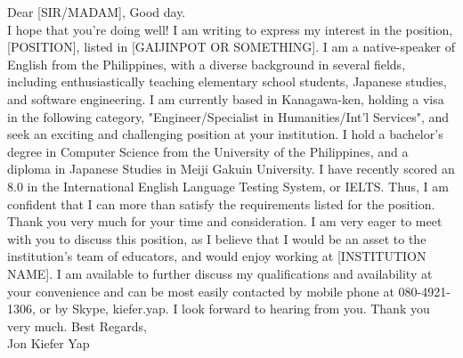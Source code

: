 
Dear [SIR/MADAM],
\doublenewline
Good day. \\
I hope that you're doing well!
\doublenewline
I am writing to express my interest in the position, [POSITION], listed in [GAIJINPOT OR SOMETHING]. 
I am a native-speaker of English from the Philippines, with a diverse background in several fields, including enthusiastically teaching elementary school students, Japanese studies, and software engineering. 
\doublenewline
I am currently based in Kanagawa-ken, holding a visa in the following category, "Engineer/Specialist in Humanities/Int'l Services", and seek an exciting and challenging position at your institution. I hold a bachelor's degree in Computer Science from the University of the Philippines, and a diploma in Japanese Studies in Meiji Gakuin University. I have recently scored an 8.0 in the International English Language Testing System, or IELTS. Thus, I am confident that I can more than satisfy the requirements listed for the position.
\doublenewline
Thank you very much for your time and consideration. I am very eager to meet with you to discuss this position, as I believe that I would be an asset to the institution's team of educators, and would enjoy working at [INSTITUTION NAME]. I am available to further discuss my qualifications and availability at your convenience and can be most easily contacted by mobile phone at 080-4921-1306, or by Skype, kiefer.yap. I look forward to hearing from you.
\doublenewline
Thank you very much.
\doublenewline
Best Regards,
\\
Jon Kiefer Yap